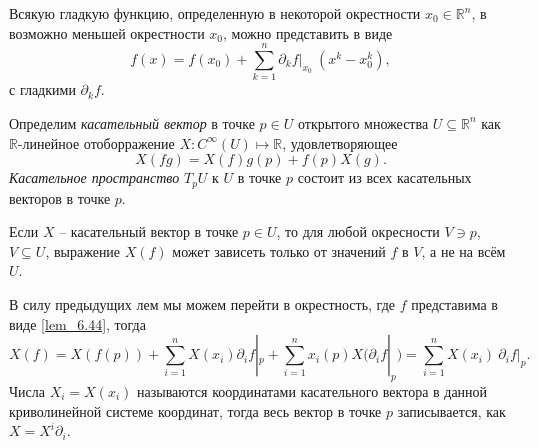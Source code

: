 


\begin{to_lem} 
    \label{lem_6.44}
    Всякую гладкую функцию, определенную в некоторой окрестности $x_0 \in \mathbb{R}^n$, в возможно меньшей окрестности $x_0$, можно представить в виде
    \begin{equation*}
         f(x) = f(x_0) + \sum_{k=1}^n \partial_k f|_{x_0}
         \
         (x^k  - x_0^k) , 
     \end{equation*} 
     с гладкими $\partial_k f$.
\end{to_lem}


\begin{to_def} 
    Определим \textit{касательный вектор} в точке $p \in U$ открытого множества $U \subseteq \mathbb{R}^n$ как $\mathbb{R}$-линейное отоборражение $X \colon C^{\infty}(U) \mapsto \mathbb{R}$, удовлетворяющее 
    \begin{equation*}
        X(fg) = X(f) g(p) + f(p) X(g).
    \end{equation*}
    \textit{Касательное пространство} $T_p U$ к $U$ в точке $p$ состоит из всех касательных векторов в точке $p$.
\end{to_def}

\begin{to_lem} 
    Если $X$ -- касательный вектор в точке $p \in U$, то для любой окресности $V \ni p$, $V \subseteq U$, выражение $X(f)$ может зависеть только от значений $f$ в $V$, а не на всём $U$. 
\end{to_lem}

В силу предыдущих лем мы можем перейти в окрестность, где $f$ представима в виде \eqref{lem_6.44}, тогда
\begin{equation*}
    X(f) = X(f(p)) + \sum_{i=1}^n X(x_i) \partial_i f|_p + \sum_{i=1}^n x_i(p) X(\partial_i f|_p) = 
    \sum_{i=1}^n X(x_i) \ \partial_i f|_p.
\end{equation*}
Числа $X_i = X(x_i)$ называются координатами касательного вектора в данной криволинейной системе координат, тогда весь вектор в точке $p$ записывается, как $X = X^i \partial_i$.
